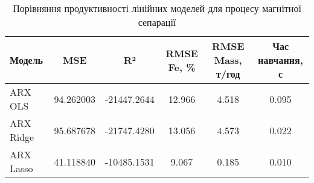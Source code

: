 \begin{table}[h]
\centering
\caption{Порівняння продуктивності лінійних моделей для процесу магнітної сепарації}
\label{tab:linear_models_comparison}
\begin{tabular}{|l|c|c|c|c|c|}
\hline
\textbf{Модель} & \textbf{MSE} & \textbf{R²} & \textbf{RMSE Fe, \%} & \textbf{RMSE Mass, т/год} & \textbf{Час навчання, с} \\
\hline
ARX OLS & 94.262003 & -21447.2644 & 12.966 & 4.518 & 0.095 \\
\hline
ARX Ridge & 95.687678 & -21747.4280 & 13.056 & 4.573 & 0.022 \\
\hline
ARX Lasso & 41.118840 & -10485.1531 & 9.067 & 0.185 & 0.010 \\
\hline
\end{tabular}
\end{table}